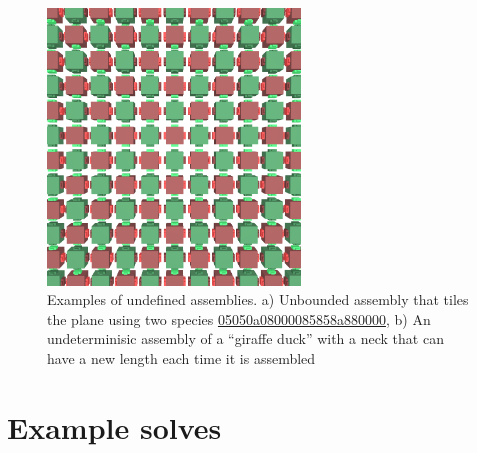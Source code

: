 \begin{figure}
    \centering
    \centering\includegraphics[width=0.6\textwidth]{figures/unbounded.png}
    \caption{Examples of undefined assemblies. a) Unbounded assembly that tiles the plane using two species \href{https://akodiat.github.io/polycubes?rule=05050a08000085858a880000}{05050a08000085858a880000}, b) An undeterminisic assembly of a ``giraffe duck'' with a neck that can have a new length each time it is assembled}
    \label{fig:sat_alg}
\end{figure}

\section{Example solves}

  